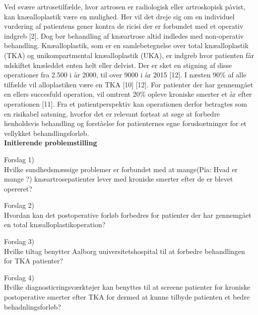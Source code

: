 Ved svære artrosetilfælde, hvor artrosen er radiologisk eller artroskopisk påvist, kan knæalloplastik være en mulighed. Her vil det dreje sig om en individuel vurdering af patientens gener kontra de ricisi der er forbundet med et operativ indgreb [2]. Dog bør behandling af knæartrose altid indledes med non-operativ behandling.
Knæalloplastik, som er en samlebetegnelse over total knæalloplastik (TKA) og unikompartmental knæalloplastik (UKA), er indgreb hvor patienten får udskiftet knæleddet enten helt eller delvist. Der er sket en stigning af disse operationer fra 2.500 i år 2000, til over 9000 i år 2015 [12].  I næsten 90\% af alle tilfælde vil alloplastiken være en TKA [10] [12].
For patienter der har gennemgået en ellers succesfuld operation, vil omtrent 20\% opleve kroniske smerter et år efter operationen [11]. Fra et patientperspektiv kan operationen derfor betragtes som en risikabel satsning, hvorfor det er relevant fortsat at søge at forbedre henholdsvis behandling og forståelse for patienternes egne forudsætninger for et vellykket behandlingsforløb. 
\\
\textbf{Initierende problemstilling}

Forslag 1)\\
Hvilke sundhedsmæssige problemer er forbundet med at mange(Pia: Hvad er mange ?)  knæartrosepatienter  lever med kroniske smerter efter de er blevet opereret?



Forslag 2)\\
Hvordan kan det postoperative forløb forbedres for patienter der har gennemgået en total knæalloplastikoperation?



Forslag 3)\\
Hvilke tiltag benytter Aalborg universitetshospital til at forbedre behandlingen for TKA patienter?




Forslag 4)\\
Hvilke diagnosticringsværktøjer kan benyttes til at screene patienter for  kroniske postoperative smerter efter TKA for dermed at kunne tilbyde patienten et bedre behadnlingsforløb?\\\\

